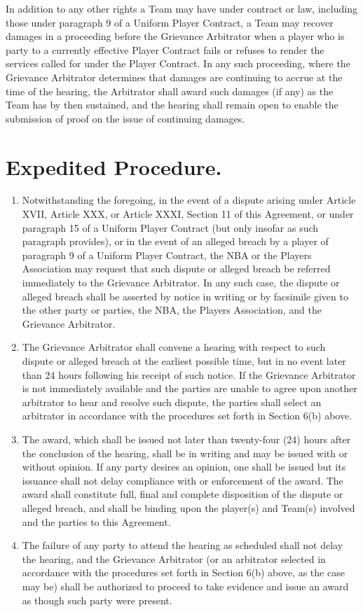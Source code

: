 \documentclass[
]{book}
\providecommand{\tightlist}{%
  \setlength{\itemsep}{0pt}\setlength{\parskip}{0pt}}
\begin{document}
In addition to any other rights a Team may have under contract or law, including those under paragraph 9 of a Uniform Player Contract, a Team may recover damages in a proceeding before the Grievance Arbitrator when a player who is party to a currently effective Player Contract fails or refuses to render the services called for under the Player Contract. In any such proceeding, where the Grievance Arbitrator determines that damages are continuing to accrue at the time of the hearing, the Arbitrator shall award such damages (if any) as the Team has by then sustained, and the hearing shall remain open to enable the submission of proof on the issue of continuing damages.

\hypertarget{expedited-procedure.}{%
\section{Expedited Procedure.}\label{expedited-procedure.}}

\begin{enumerate}
\def\labelenumi{(\alph{enumi})}
\tightlist
\item
  Notwithstanding the foregoing, in the event of a dispute arising under Article XVII, Article XXX, or Article XXXI, Section 11 of this Agreement, or under paragraph 15 of a Uniform Player Contract (but only insofar as such paragraph provides), or in the event of an alleged breach by a player of paragraph 9 of a Uniform Player Contract, the NBA or the Players Association may request that such dispute or alleged breach be referred immediately to the Grievance Arbitrator. In any such case, the dispute or alleged breach shall be asserted by notice in writing or by facsimile given to the other party or parties, the NBA, the Players Association, and the Grievance Arbitrator.
\item
  The Grievance Arbitrator shall convene a hearing with respect to such dispute or alleged breach at the earliest possible time, but in no event later than 24 hours following his receipt of such notice. If the Grievance Arbitrator is not immediately available and the parties are unable to agree upon another arbitrator to hear and resolve such dispute, the parties shall select an arbitrator in accordance with the procedures set forth in Section 6(b) above.
\item
  The award, which shall be issued not later than twenty-four (24) hours after the conclusion of the hearing, shall be in writing and may be issued with or without opinion. If any party desires an opinion, one shall be issued but its issuance shall not delay compliance with or enforcement of the award. The award shall constitute full, final and complete disposition of the dispute or alleged breach, and shall be binding upon the player(s) and Team(s) involved and the parties to this Agreement.
\item
  The failure of any party to attend the hearing as scheduled shall not delay the hearing, and the Grievance Arbitrator (or an arbitrator selected in accordance with the procedures set forth in Section 6(b) above, as the case may be) shall be authorized to proceed to take evidence and issue an award as though such party were present.
\end{enumerate}
\end{document}

